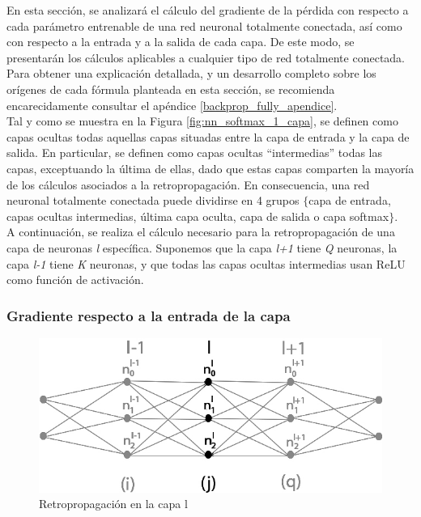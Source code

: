 En esta sección, se analizará el cálculo del gradiente de la pérdida con respecto a cada parámetro entrenable de una red neuronal totalmente conectada, así como con respecto a la entrada y a la salida de cada capa. De este modo, se presentarán los cálculos aplicables a cualquier tipo de red totalmente conectada. Para obtener una explicación detallada, y un desarrollo completo sobre los orígenes de cada fórmula planteada en esta sección, se recomienda encarecidamente consultar el apéndice \ref{backprop_fully_apendice}.\\

Tal y como se muestra en la Figura \ref{fig:nn_softmax_1_capa}, se definen como capas ocultas todas aquellas capas situadas entre la capa de entrada y la capa de salida.
En particular, se definen como capas ocultas ``intermedias'' todas las capas, exceptuando la última de ellas, dado que estas capas comparten la mayoría de los cálculos asociados a la retropropagación. En consecuencia, una red neuronal totalmente conectada puede dividirse en 4 grupos $\{$capa de entrada, capas ocultas intermedias, última capa oculta, capa de salida o capa softmax$\}$. \\
A continuación, se realiza el cálculo necesario para la retropropagación de una capa de neuronas \textit{l} específica. Suponemos que la capa \textit{l+1} tiene \textit{Q} neuronas, la capa \textit{l-1} tiene \textit{K} neuronas, y que todas las capas ocultas intermedias usan ReLU como función de activación. \\

\subsubsection{Gradiente respecto a la entrada de la capa}

\begin{figure}[H]
	\centering
	\includegraphics[scale=0.35]{imagenes/conclusion_capa_l.jpg}  
	\caption{Retropropagación en la capa l}
	\label{fig:conclusion_capa_l}
\end{figure}

